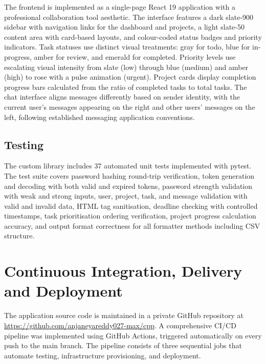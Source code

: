 \documentclass[conference]{IEEEtran}
\begin{document}
The frontend is implemented as a single-page React 19 application with a professional collaboration tool aesthetic. The interface features a dark slate-900 sidebar with navigation links for the dashboard and projects, a light slate-50 content area with card-based layouts, and colour-coded status badges and priority indicators. Task statuses use distinct visual treatments: gray for todo, blue for in-progress, amber for review, and emerald for completed. Priority levels use escalating visual intensity from slate (low) through blue (medium) and amber (high) to rose with a pulse animation (urgent). Project cards display completion progress bars calculated from the ratio of completed tasks to total tasks. The chat interface aligns messages differently based on sender identity, with the current user's messages appearing on the right and other users' messages on the left, following established messaging application conventions.

\subsection{Testing}

The custom library includes 37 automated unit tests implemented with pytest. The test suite covers password hashing round-trip verification, token generation and decoding with both valid and expired tokens, password strength validation with weak and strong inputs, user, project, task, and message validation with valid and invalid data, HTML tag sanitisation, deadline checking with controlled timestamps, task prioritisation ordering verification, project progress calculation accuracy, and output format correctness for all formatter methods including CSV structure.

\section{Continuous Integration, Delivery and Deployment}

The application source code is maintained in a private GitHub repository at \url{https://github.com/anjaneyareddy027-max/cpp}. A comprehensive CI/CD pipeline was implemented using GitHub Actions, triggered automatically on every push to the main branch. The pipeline consists of three sequential jobs that automate testing, infrastructure provisioning, and deployment.
\end{document}

